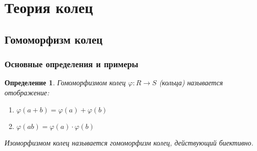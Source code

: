 \documentclass[10pt,a4paper]{article}
\newtheorem{definition}{Определение}
\begin{document}
	\setcounter{section}{1}
	\section{Теория колец}
		\setcounter{subsection}{3}
		\subsection{Гомоморфизм колец}
			\subsubsection{Основные определения и примеры}
				\begin{definition}
					Гомоморфизмом колец $\varphi: R \to S$ (кольца) называется отображение:
					\begin{enumerate}
						\item $\varphi(a+b) = \varphi(a) + \varphi(b)$
						\item $\varphi(ab) = \varphi(a) \cdot \varphi(b)$
					\end{enumerate}
					Изоморфизмом колец называется гомоморфизм колец, действующий биективно.
				\end{definition}
\end{document}
